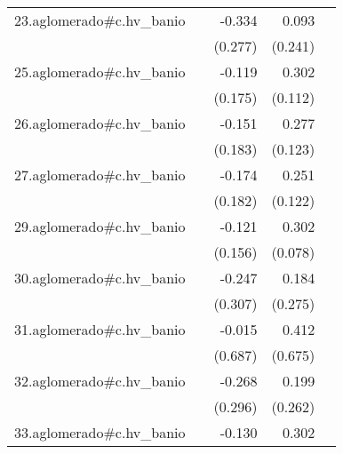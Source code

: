 {\begin{longtable}{l*{4}{D{.}{.}{-1}}}
\addlinespace
23.aglomerado#c.hv\_banio&                     &      -0.334         &       0.093         &                     \\
            &                     &     (0.277)         &     (0.241)         &                     \\
\addlinespace
25.aglomerado#c.hv\_banio&                     &      -0.119         &       0.302\sym{**} &                     \\
            &                     &     (0.175)         &     (0.112)         &                     \\
\addlinespace
26.aglomerado#c.hv\_banio&                     &      -0.151         &       0.277\sym{*}  &                     \\
            &                     &     (0.183)         &     (0.123)         &                     \\
\addlinespace
27.aglomerado#c.hv\_banio&                     &      -0.174         &       0.251\sym{*}  &                     \\
            &                     &     (0.182)         &     (0.122)         &                     \\
\addlinespace
29.aglomerado#c.hv\_banio&                     &      -0.121         &       0.302\sym{***}&                     \\
            &                     &     (0.156)         &     (0.078)         &                     \\
\addlinespace
30.aglomerado#c.hv\_banio&                     &      -0.247         &       0.184         &                     \\
            &                     &     (0.307)         &     (0.275)         &                     \\
\addlinespace
31.aglomerado#c.hv\_banio&                     &      -0.015         &       0.412         &                     \\
            &                     &     (0.687)         &     (0.675)         &                     \\
\addlinespace
32.aglomerado#c.hv\_banio&                     &      -0.268         &       0.199         &                     \\
            &                     &     (0.296)         &     (0.262)         &                     \\
\addlinespace
33.aglomerado#c.hv\_banio&                     &      -0.130         &       0.302\sym{***}&                     \\

\end{longtable}}
